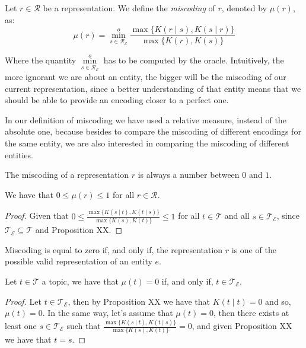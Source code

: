 \begin{definition} [Miscoding]
\label{def:miscoding}
Let $r \in \mathcal{R}$ be a representation. We define the \emph{miscoding} of $r$, denoted by $\mu(r)$, as:
\[
\mu(r) = \overset{o}{ \underset{s \in \mathcal{R}_\mathcal{E}} \min} \frac{ \max\{ K(r \mid s), K(s \mid r) \} } { \max\{ K(r), K(s) \} }
\]
\end{definition}

Where the quantity $\overset{o}{ \underset{s \in \mathcal{R}_\mathcal{E}} \min}$ has to be computed by the oracle. Intuitively, the more ignorant we are about an entity, the bigger will be the miscoding of our current representation, since a better understanding of that entity means that we should be able to provide an encoding closer to a perfect one.

In our definition of miscoding we have used a relative measure, instead of the absolute one, because besides to compare the miscoding of different encodings for the same entity, we are also interested in comparing the miscoding of different entities.

The miscoding of a representation $r$ is always a number between $0$ and $1$.

\begin{proposition}
\label{prop:range_miscoding}
We have that $0 \leq \mu(r) \leq 1$ for all $r \in \mathcal{R}$.
\end{proposition}
\begin{proof}
Given that $0 \leq \frac{ \max\{ K(s \mid t), K(t \mid s) \} } { \max\{ K(s), K(t) \} } \leq 1$ for all $t \in \mathcal{T}$ and all $s \in \mathcal{T}_\mathcal{E}$, since $\mathcal{T}_\mathcal{E} \subseteq \mathcal{T}$ and Proposition {\color{red} XX}.
\end{proof}

Miscoding is equal to zero if, and only if, the representation $r$ is one of the possible valid representation of an entity $e$.

\begin{proposition}\label{prop:perfect_encoding}
Let $t \in \mathcal{T}$ a topic, we have that $\mu(t) = 0$ if, and only if, $t \in \mathcal{T}_\mathcal{E}$.
\end{proposition}
\begin{proof}
Let $t \in \mathcal{T}_\mathcal{E}$, then by Proposition {\color{red} XX} we have that $K(t \mid t) = 0$ and so, $\mu(t) = 0$. In the same way, let's assume that $\mu(t) = 0$, then there exists at least one $s \in \mathcal{T}_\mathcal{E}$ such that $\frac{ \max\{ K(s \mid t), K(t \mid s) \} } { \max\{ K(s), K(t) \} } = 0$, and given Proposition {\color{red} XX} we have that $t = s$.
\end{proof}

